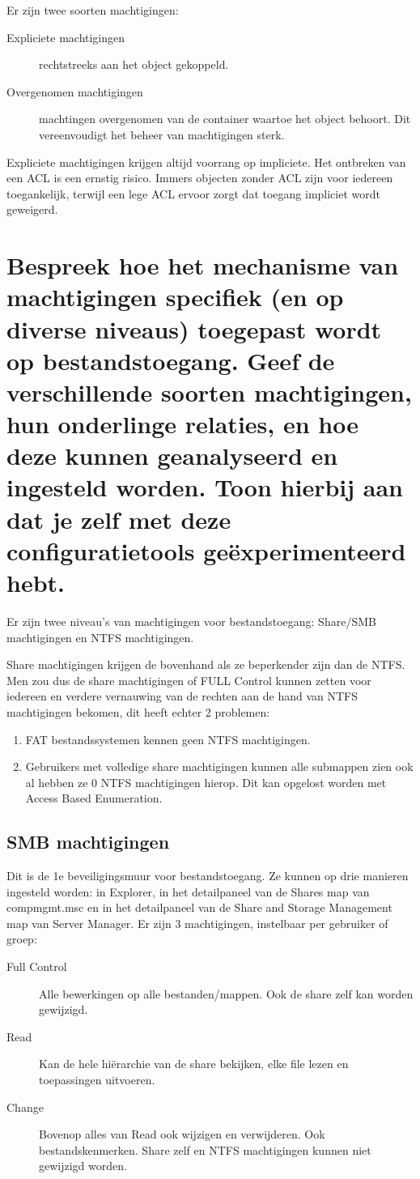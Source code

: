 Er zijn twee soorten machtigingen:
\begin{description}
	\item[Expliciete machtigingen] rechtstreeks aan het object gekoppeld.
	\item[Overgenomen machtigingen] machtingen overgenomen van de container
		waartoe het object behoort. Dit vereenvoudigt het beheer van
		machtigingen sterk.
\end{description}

Expliciete machtigingen krijgen altijd voorrang op impliciete. Het ontbreken van
een ACL is een ernstig risico. Immers objecten zonder ACL zijn voor iedereen
toegankelijk, terwijl een lege ACL ervoor zorgt dat toegang impliciet wordt
geweigerd.

\section{Bespreek hoe het mechanisme van machtigingen specifiek (en op diverse
niveaus) toegepast wordt op bestandstoegang. Geef de verschillende soorten
machtigingen, hun onderlinge relaties, en hoe deze kunnen geanalyseerd en
ingesteld worden. Toon hierbij aan dat je zelf met deze configuratietools
geëxperimenteerd hebt.}

Er zijn twee niveau's van machtigingen voor bestandstoegang: Share/SMB
machtigingen en NTFS machtigingen.

Share machtigingen krijgen de bovenhand als ze beperkender zijn dan de NTFS. Men
zou dus de share machtigingen of FULL Control kunnen zetten voor iedereen en
verdere vernauwing van de rechten aan de hand van NTFS machtigingen bekomen, dit
heeft echter 2 problemen:
\begin{enumerate}
	\item FAT bestandssystemen kennen geen NTFS machtigingen.
	\item Gebruikers met volledige share machtigingen kunnen alle submappen
		zien ook al hebben ze 0 NTFS machtigingen hierop. Dit kan
		opgelost worden met Access Based Enumeration.
\end{enumerate}

\subsection{SMB machtigingen}

Dit is de 1e beveiligingsmuur voor bestandstoegang. Ze kunnen op drie manieren
ingesteld worden: in Explorer, in het detailpaneel van de Shares map van
compmgmt.msc en in het detailpaneel van de Share and Storage Management map van
Server Manager. Er zijn 3 machtigingen, instelbaar per gebruiker of groep:
\begin{description}
	\item[Full Control] Alle bewerkingen op alle bestanden/mappen. Ook de
		share zelf kan worden gewijzigd.
	\item[Read] Kan de hele hiërarchie van de share bekijken, elke file
		lezen en toepassingen uitvoeren.
	\item[Change] Bovenop alles van Read ook wijzigen en verwijderen. Ook
		bestandskenmerken. Share zelf en NTFS machtigingen kunnen niet
		gewijzigd worden.
\end{description}

